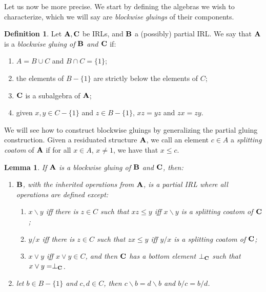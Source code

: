 \documentclass{amsart}
\newtheorem{lemma}[theorem]{Lemma}
\theoremstyle{definition}
\newtheorem{definition}[theorem]{Definition}
\numberwithin{equation}{section}
\newcommand{\join}{\vee}
\newcommand{\alg}[1]{{\textbf{\upshape #1}}}  %
\begin{document}
Let us now be more precise. We start by defining the algebras we wish to characterize, which we will say are {\em blockwise gluings} of their components.


\begin{definition}\label{def: block IRL}
	Let $\alg A, \alg C$ be IRLs, and $\alg B$ a (possibly) partial IRL. We say that $\alg A$ is a {\em blockwise gluing of $\alg B$ and $\alg C$} if:
	\begin{enumerate}
		\item $A =B \cup C$ and $B \cap C = \{1\}$;
		\item the elements of $B-\{1\}$ are strictly below the elements of $C$;
		\item $\alg C$ is a subalgebra of $\alg A$;
		\item given $x, y \in C -\{1\}$ and $z \in B-\{1\}$, $xz = yz$ and $zx = zy$.
	\end{enumerate}

\end{definition}
We will see how to construct blockwise gluings by generalizing the partial gluing construction. Given a residuated structure $\alg A$, we call an element $c \in A$ a {\em splitting coatom} of $\alg A$ if for all $x \in A$, $x \neq 1$, we have that $x \leq c$.
\begin{lemma} \label{lemma: propblockwise gluing}
	If $\alg A$ is a blockwise gluing of $\alg B$ and $\alg C$, then:
	\begin{enumerate}
		\item $\alg B$, with the inherited operations from $\alg A$, is a partial IRL where all operations are defined except:\begin{enumerate} 
		\item $x \backslash y$ iff there is $z \in C$ such that $xz \leq y$ iff $x \backslash y$ is a splitting coatom of $\alg C$;  
		\item $y /x$ iff there is $z \in C$ such that $zx \leq y$ iff $y / x $ is a splitting coatom of $\alg C$; 
		\item $x \lor y$ iff $x \lor y \in C$, and then $\alg C$ has a bottom element $\perp _{\alg C}$ such that $x \join y = \perp_{\alg C}$.
		\end{enumerate}
		\item let $b \in B-\{1\}$ and $c,d \in C$, then $c \backslash b = d \backslash b$ and $b / c = b / d$.
	\end{enumerate}
\end{lemma}
\end{document}
